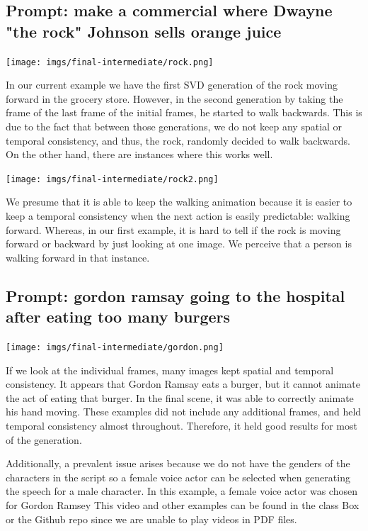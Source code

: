 \documentclass[conference]{IEEEtran}
\begin{document}
\subsection{\textbf{Prompt}: make a commercial where Dwayne "the rock" Johnson sells orange juice}

\begin{center}
\texttt{[image: imgs/final-intermediate/rock.png]}
\end{center}

In our current example we have the first SVD generation of the rock moving forward in the grocery store. However, in the second generation by taking the frame of the last frame of the initial frames, he started to walk backwards. This is due to the fact that between those generations, we do not keep any spatial or temporal consistency, and thus, the rock, randomly decided to walk backwards. On the other hand, there are instances where this works well.

\begin{center}
\texttt{[image: imgs/final-intermediate/rock2.png]}
\end{center}

We presume that it is able to keep the walking animation because it is easier to keep a temporal consistency when the next action is easily predictable: walking forward. Whereas, in our first example, it is hard to tell if the rock is moving forward or backward by just looking at one image. We perceive that a person is walking forward in that instance.

\subsection{\textbf{Prompt}: gordon ramsay going to the hospital after eating too many burgers}

\begin{center}
\texttt{[image: imgs/final-intermediate/gordon.png]}
\end{center}

If we look at the individual frames, many images kept spatial and temporal consistency. It appears that Gordon Ramsay eats a burger, but it cannot animate the act of eating that burger. In the final scene, it was able to correctly animate his hand moving. These examples did not include any additional frames, and held temporal consistency almost throughout. Therefore, it held good results for most of the generation.

Additionally, a prevalent issue arises because we do not have the genders of the characters in the script so a female voice actor can be selected when generating the speech for a male character. In this example,
a female voice actor was chosen for Gordon Ramsey
This video and other examples can be found in the class Box or the Github repo since we
are unable to play videos in PDF files.
\end{document}
